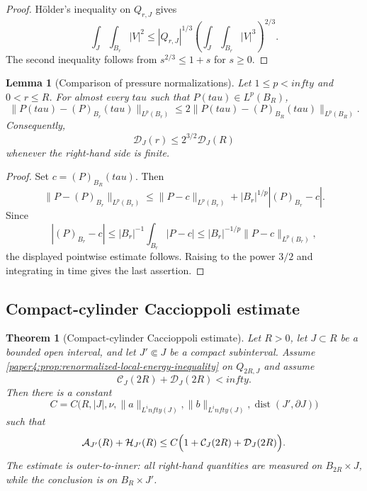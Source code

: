 \documentclass[11pt]{amsart}
\def\mathbb#1{#1}%
\def\tau{tau}%
\def\infty{infty}%
\theoremstyle{plain}
\newtheorem{theorem}{Theorem}[section]
\newtheorem{lemma}[lemma]{Lemma}
\theoremstyle{definition}
\theoremstyle{remark}
\begin{document}
\begin{proof}
H\"older's inequality on $Q_{r,J}$ gives
\[
\int_J\!\int_{B_r}|V|^2
\le |Q_{r,J}|^{1/3}\left(\int_J\!\int_{B_r}|V|^3\right)^{2/3}.
\]
The second inequality follows from $s^{2/3}\le 1+s$ for $s\ge0$.
\end{proof}

\begin{lemma}[Comparison of pressure normalizations]\label{paper4:lem:pressure-means}
Let $1\le p<\infty$ and $0<r\le R$. For almost every $\tau$ such that
$P(\tau)\in L^p(B_R)$,
\[
\|P(\tau)-(P)_{B_r}(\tau)\|_{L^p(B_r)}
\le 2\|P(\tau)-(P)_{B_R}(\tau)\|_{L^p(B_R)}.
\]
Consequently,
\[
\mathcal D_J(r)\le 2^{3/2}\mathcal D_J(R)
\]
whenever the right-hand side is finite.
\end{lemma}

\begin{proof}
Set $c=(P)_{B_R}(\tau)$. Then
\[
\|P-(P)_{B_r}\|_{L^p(B_r)}
\le \|P-c\|_{L^p(B_r)}+|B_r|^{1/p}|(P)_{B_r}-c|.
\]
Since
\[
|(P)_{B_r}-c|\le |B_r|^{-1}\int_{B_r}|P-c|
\le |B_r|^{-1/p}\|P-c\|_{L^p(B_r)},
\]
the displayed pointwise estimate follows. Raising to the power $3/2$ and
integrating in time gives the last assertion.
\end{proof}

\subsection{Compact-cylinder Caccioppoli estimate}

\begin{theorem}[Compact-cylinder Caccioppoli estimate]\label{paper4:thm:caccioppoli}
Let $R>0$, let $J\subset\mathbb R$ be a bounded open interval, and let
$J'\Subset J$ be a compact subinterval. Assume
\cref{paper4:prop:renormalized-local-energy-inequality} on $Q_{2R,J}$ and assume
\[
\mathcal C_J(2R)+\mathcal D_J(2R)<\infty.
\]
Then there is a constant
\[
C=C\bigl(R,|J|,\nu,\|a\|_{L^\infty(J)},\|b\|_{L^\infty(J)},
\operatorname{dist}(J',\partial J)\bigr)
\]
such that
\[
\mathcal A_{J'}(R)+\mathcal H_{J'}(R)
\le C\Bigl(1+
\mathcal C_J(2R)+\mathcal D_J(2R)
\Bigr).
\]
The estimate is outer-to-inner: all right-hand quantities are measured on
$B_{2R}\times J$, while the conclusion is on $B_R\times J'$.
\end{theorem}
\end{document}
